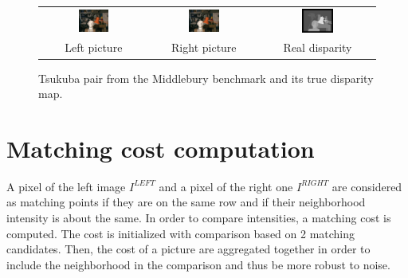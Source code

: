 \documentclass{ipol}
\begin{document}
\begin{figure}[h]
\begin{center}	
\begin{tabular}{ccc}
\includegraphics[width=0.3\textwidth]{Images/pictures/tsukuba.png} &
\includegraphics[width=0.3\textwidth]{Images/tsukuba/right.png} &
\includegraphics[width=0.3\textwidth]{Images/true_disparity/tsukuba.png}
\\
Left picture & Right picture & Real disparity
\end{tabular}
	\caption{Tsukuba pair from the Middlebury benchmark \cite{middleBench} and its true disparity map.}
\end{center}
\end{figure}

\newpage

\section{Matching cost computation}

A pixel of the left image $I^{LEFT}$ and a pixel of the right one $I^{RIGHT}$ are considered as matching points if they are on the same row and if their neighborhood intensity is about the same. In order to compare intensities, a matching cost is computed. The cost is initialized with comparison based on 2 matching candidates. Then, the cost of a picture are aggregated together in order to include the neighborhood in the comparison and thus be more robust to noise. 
\end{document}
